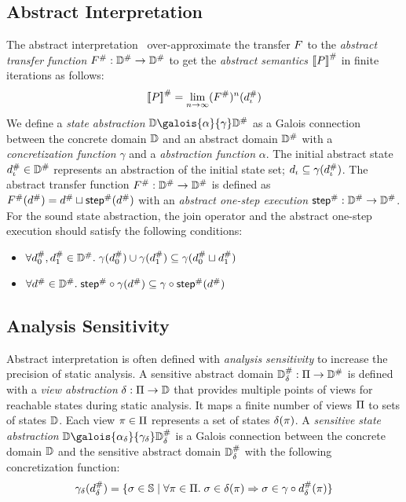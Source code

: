 \subsection{Abstract Interpretation}
The abstract interpretation~\cite{abs-interp-1977, abs-interp-1992}
over-approximate the transfer $F$ to the \textit{abstract transfer
function} ${F}^{\#}: {\mathbb{D}}^{\#} \rightarrow {\mathbb{D}}^{\#}$ to get the
\textit{abstract semantics} ${[\![{P}]\!]}^{\#}$ in finite iterations as follows:
\[
    {[\![{P}]\!]}^{\#} = \underset{n \rightarrow
    \infty}{\lim}{({F}^{\#})^n({d}^{\#}_\iota)}\\
\]
We define a \textit{state abstraction} $\dom \galois{\alpha}{\gamma} \absdom$ as
a Galois connection between the concrete domain $\mathbb{D}$ and an abstract domain
${\mathbb{D}}^{\#}$ with a \textit{concretization function} $\gamma$ and a
\textit{abstraction function} $\alpha$.  The initial abstract state ${d}^{\#}_\iota
\in {\mathbb{D}}^{\#}$ represents an abstraction of the initial state set; $d_\iota
\subseteq \gamma({d}^{\#}_\iota)$.  The abstract transfer function ${F}^{\#}:
{\mathbb{D}}^{\#} \rightarrow {\mathbb{D}}^{\#}$ is defined as ${F}^{\#}({d}^{\#}) = {d}^{\#}
\sqcup {\textsf{step}}^{\#}({d}^{\#})$ with an \textit{abstract one-step execution}
${\textsf{step}}^{\#}: {\mathbb{D}}^{\#} \rightarrow {\mathbb{D}}^{\#}$.  For the sound state abstraction, the
join operator and the abstract one-step execution should satisfy the following
conditions:
\begin{itemize}
  \item $\forall {d}^{\#}_0, {d}^{\#}_1 \in {\mathbb{D}}^{\#}. \; \gamma({d}^{\#}_0) \cup
    \gamma({d}^{\#}_1) \subseteq \gamma({d}^{\#}_0 \sqcup {d}^{\#}_1)$
  \item $\forall {d}^{\#} \in {\mathbb{D}}^{\#}. \; {\textsf{step}}^{\#} \circ \gamma({d}^{\#}) \subseteq
    \gamma \circ {\textsf{step}}^{\#}({d}^{\#})$
\end{itemize}


\subsection{Analysis Sensitivity}

Abstract interpretation is often defined with \textit{analysis sensitivity} to
increase the precision of static analysis.  A sensitive abstract domain
${\mathbb{D}}^{\#}_\delta: \Pi \rightarrow {\mathbb{D}}^{\#}$ is defined with a \textit{view
abstraction} $\delta: \Pi \rightarrow \mathbb{D}$ that provides multiple points
of views for reachable states during static analysis.  It maps a finite number
of views $\Pi$ to sets of states $\mathbb{D}$. Each view $\pi \in \Pi$
represents a set of states $\delta(\pi)$.
A \textit{sensitive state abstraction} $\dom
\galois{\alpha_\viewmap}{\gamma_\viewmap} \sabsdom$ is a Galois connection between
the concrete domain $\mathbb{D}$ and the sensitive abstract domain ${\mathbb{D}}^{\#}_\delta$ with the
following concretization function:
\[
  \gamma_\delta({d}^{\#}_\delta) = \{ \sigma \in \mathbb{S} \mid \forall \pi \in \Pi.
  \; \sigma \in \delta(\pi) \Rightarrow \sigma \in \gamma \circ {d}^{\#}_\delta(\pi) \}
\]

